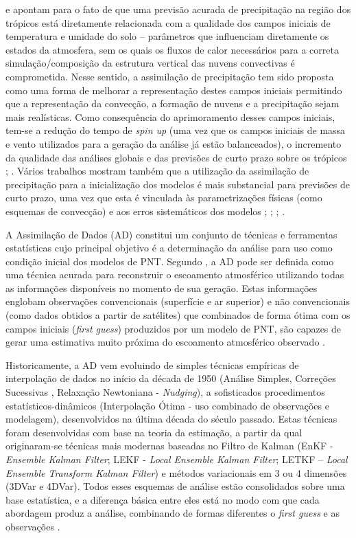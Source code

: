  e  apontam para o fato de que uma previsão acurada de precipitação na região dos trópicos está diretamente relacionada com a qualidade dos campos iniciais de temperatura e umidade do solo – parâmetros que influenciam diretamente os estados da atmosfera, sem os quais os fluxos de calor necessários para a correta simulação/composição da estrutura vertical das nuvens convectivas é comprometida. Nesse sentido, a assimilação de precipitação tem sido proposta como uma forma de melhorar a representação destes campos iniciais permitindo que a representação da convecção, a formação de nuvens e a precipitação sejam mais realísticas. Como consequência do aprimoramento desses campos iniciais, tem-se a redução do tempo de \textit{spin up} (uma vez que os campos iniciais de massa e vento utilizados para a geração da análise já estão balanceados), o incremento da qualidade das análises globais e das previsões de curto prazo sobre os trópicos \cite{heckleyetal90}; \cite{falkovichetal00}. Vários trabalhos mostram também que a utilização da assimilação de precipitação para a inicialização dos modelos é mais substancial para previsões de curto prazo, uma vez que esta é vinculada às parametrizações físicas (como esquemas de convecção) e aos erros sistemáticos dos modelos \cite{kasaharaetal94}; \cite{mathur95}; \cite{zupanskimesinger95}; \cite{nunescocke04}.

A Assimilação de Dados (AD) constitui um conjunto de técnicas e ferramentas estatísticas cujo principal objetivo é a determinação da análise para uso como condição inicial dos modelos de PNT. Segundo , a AD pode ser definida como uma técnica acurada para reconstruir o escoamento atmosférico utilizando todas as informações disponíveis no momento de sua geração. Estas informações englobam observações convencionais (superfície e ar superior) e não convencionais (como dados obtidos a partir de satélites) que combinados de forma ótima com os campos iniciais (\textit{first guess}) produzidos por um modelo de PNT, são capazes de gerar uma estimativa muito próxima do escoamento atmosférico observado \cite{kalnay03}.

Historicamente, a AD vem evoluindo de simples técnicas empíricas de interpolação de dados no início da década de 1950 (Análise Simples, Correções Sucessivas \cite{cressman59}, Relaxação Newtoniana - \textit{Nudging}), a sofisticados procedimentos estatísticos-dinâmicos (Interpolação Ótima - uso combinado de observações e modelagem), desenvolvidos na última década do século passado. Estas técnicas foram desenvolvidas com base na teoria da estimação, a partir da qual originaram-se técnicas mais modernas baseadas no Filtro de Kalman (EnKF - \textit{Ensemble Kalman Filter}; LEKF - \textit{Local Ensemble Kalman Filter}; LETKF – \textit{Local Ensemble Transform Kalman Filter}) e métodos variacionais em 3 ou 4 dimensões (3DVar e 4DVar). Todos esses esquemas de análise estão consolidados sobre uma base estatística, e a diferença básica entre eles está no modo com que cada abordagem produz a análise, combinando de formas diferentes o \textit{first guess} e as observações \cite{kalnay03}.

